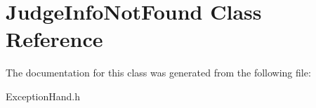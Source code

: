 \hypertarget{class_judge_info_not_found}{}\section{Judge\+Info\+Not\+Found Class Reference}
\label{class_judge_info_not_found}


The documentation for this class was generated from the following file\+:\begin{DoxyCompactItemize}
\item 
Exception\+Hand.\+h\end{DoxyCompactItemize}
